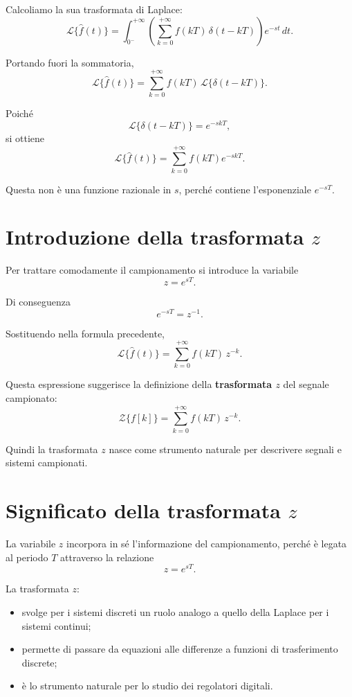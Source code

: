 Calcoliamo la sua trasformata di Laplace:
\[
\mathcal{L}\{\hat f(t)\}
=
\int_{0^-}^{+\infty}
\left(
\sum_{k=0}^{+\infty} f(kT)\,\delta(t-kT)
\right)e^{-st}\,dt.
\]

Portando fuori la sommatoria,
\[
\mathcal{L}\{\hat f(t)\}
=
\sum_{k=0}^{+\infty} f(kT)\,\mathcal{L}\{\delta(t-kT)\}.
\]

Poiché
\[
\mathcal{L}\{\delta(t-kT)\}=e^{-skT},
\]
si ottiene
\[
\mathcal{L}\{\hat f(t)\}
=
\sum_{k=0}^{+\infty} f(kT)e^{-skT}.
\]

Questa non è una funzione razionale in \(s\), perché contiene l'esponenziale \(e^{-sT}\).

\section{Introduzione della trasformata \(z\)}

Per trattare comodamente il campionamento si introduce la variabile
\[
z=e^{sT}.
\]

Di conseguenza
\[
e^{-sT}=z^{-1}.
\]

Sostituendo nella formula precedente,
\[
\mathcal{L}\{\hat f(t)\}
=
\sum_{k=0}^{+\infty} f(kT)\,z^{-k}.
\]

Questa espressione suggerisce la definizione della \textbf{trasformata \(z\)} del segnale campionato:
\[
\mathcal{Z}\{f[k]\}
=
\sum_{k=0}^{+\infty} f(kT)\,z^{-k}.
\]

Quindi la trasformata \(z\) nasce come strumento naturale per descrivere
segnali e sistemi campionati.

\section{Significato della trasformata \(z\)}

La variabile \(z\) incorpora in sé l'informazione del campionamento,
perché è legata al periodo \(T\) attraverso la relazione
\[
z=e^{sT}.
\]

La trasformata \(z\):
\begin{itemize}
    \item svolge per i sistemi discreti un ruolo analogo a quello della Laplace
    per i sistemi continui;
    \item permette di passare da equazioni alle differenze a funzioni di trasferimento discrete;
    \item è lo strumento naturale per lo studio dei regolatori digitali.
\end{itemize}

